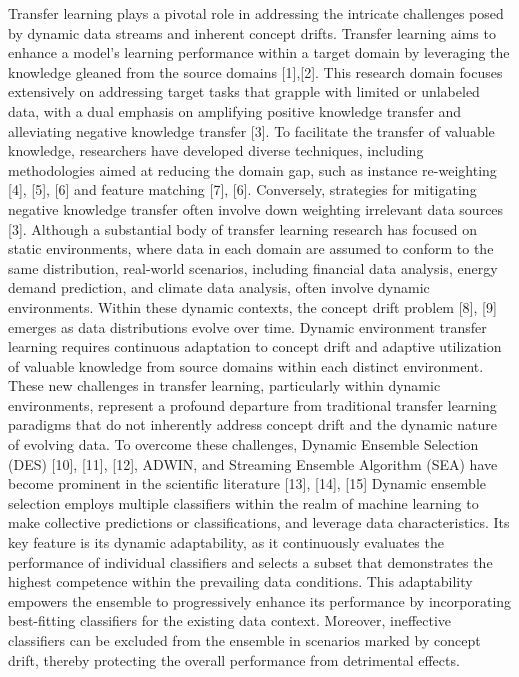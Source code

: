 Transfer learning plays a pivotal role in addressing the intricate challenges posed by dynamic data streams and inherent concept drifts. Transfer learning aims to enhance a model's learning performance within a target domain by leveraging the knowledge gleaned from the source domains [1],[2]. This research domain focuses extensively on addressing target tasks that grapple with limited or unlabeled data, with a dual emphasis on amplifying positive knowledge transfer and alleviating negative knowledge transfer [3]. To facilitate the transfer of valuable knowledge, researchers have developed diverse techniques, including methodologies aimed at reducing the domain gap, such as instance re-weighting [4], [5], [6] and feature matching [7],  [6]. Conversely, strategies for mitigating negative knowledge transfer often involve down weighting irrelevant data sources [3].
Although a substantial body of transfer learning research has focused on static environments, where data in each domain are assumed to conform to the same distribution, real-world scenarios, including financial data analysis, energy demand prediction, and climate data analysis, often involve dynamic environments. Within these dynamic contexts, the concept drift problem [8], [9] emerges as data distributions evolve over time. Dynamic environment transfer learning requires continuous adaptation to concept drift and adaptive utilization of valuable knowledge from source domains within each distinct environment. These new challenges in transfer learning, particularly within dynamic environments, represent a profound departure from traditional transfer learning paradigms that do not inherently address concept drift and the dynamic nature of evolving data.
To overcome these challenges, Dynamic Ensemble Selection (DES) [10], [11], [12], ADWIN, and Streaming Ensemble Algorithm (SEA) have become prominent in the scientific literature [13], [14], [15] Dynamic ensemble selection employs multiple classifiers within the realm of machine learning to make collective predictions or classifications, and leverage data characteristics. Its key feature is its dynamic adaptability, as it continuously evaluates the performance of individual classifiers and selects a subset that demonstrates the highest competence within the prevailing data conditions. This adaptability empowers the ensemble to progressively enhance its performance by incorporating best-fitting classifiers for the existing data context. Moreover, ineffective classifiers can be excluded from the ensemble in scenarios marked by concept drift, thereby protecting the overall performance from detrimental effects.
